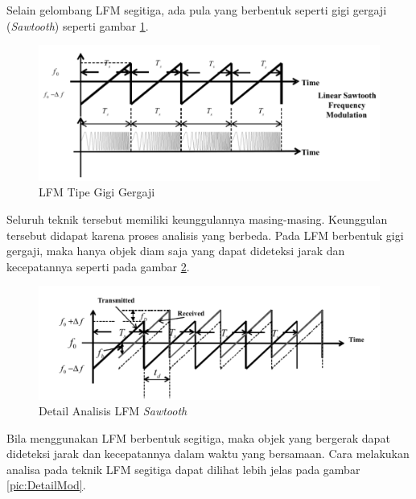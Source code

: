 Selain gelombang LFM segitiga, ada pula yang berbentuk seperti gigi gergaji (\textit{Sawtooth}) seperti gambar \ref{pic:lfmSaw}.

\begin{figure}
	\begin{center}
		\includegraphics[scale=0.65]{pics/bab2/lfmSawtooth.png}
		\caption[LFM Tipe Gigi Gergaji]{LFM Tipe Gigi Gergaji \cite{Jankiraman2018}}
		\label{pic:lfmSaw}
	\end{center}
\end{figure}

Seluruh teknik tersebut memiliki keunggulannya masing-masing. Keunggulan tersebut didapat karena proses analisis yang berbeda. Pada LFM berbentuk gigi gergaji, maka hanya objek diam saja yang dapat dideteksi jarak dan kecepatannya seperti pada gambar \ref{pic:lfmDetail}.

\begin{figure}
	\begin{center}
		\includegraphics[scale=0.65]{pics/bab2/lfmDetail.png}
		\caption[Detail Analisis LFM \textit{Sawtooth}]{Detail Analisis LFM \textit{Sawtooth} \cite{Jankiraman2018}}
		\label{pic:lfmDetail}
	\end{center}
\end{figure}

Bila menggunakan LFM berbentuk segitiga, maka objek yang bergerak dapat dideteksi jarak dan kecepatannya dalam waktu yang bersamaan. Cara melakukan analisa pada teknik LFM segitiga dapat dilihat lebih jelas pada gambar \ref{pic:DetailMod}.

